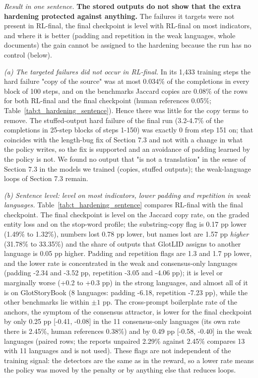 \emph{Result in one sentence.} \textbf{The stored outputs do not show that the extra hardening protected against anything.} The failures it targets were not present in RL-final, the final checkpoint is level with RL-final on most indicators, and where it is better (padding and repetition in the weak languages, whole documents) the gain cannot be assigned to the hardening because the run has no control (below).

\emph{(a) The targeted failures did not occur in RL-final.} In its 1,433 training steps the hard failure "copy of the source" was at most 0.034\% of the completions in every block of 100 steps, and on the benchmarks Jaccard copies are 0.08\% of the rows for both RL-final and the final checkpoint (human references 0.05\%; Table~\ref{tab:t_hardening_sentence}). Hence there was little for the copy terms to remove. The stuffed-output hard failure of the final run (3.2-4.7\% of the completions in 25-step blocks of steps 1-150) was exactly 0 from step 151 on; that coincides with the length-bug fix of Section 7.3 and not with a change in what the policy writes, so the fix is supported and an avoidance of padding learned by the policy is not. We found no output that "is not a translation" in the sense of Section 7.3 in the models we trained (copies, stuffed outputs); the weak-language loops of Section 7.3 remain.

\emph{(b) Sentence level: level on most indicators, lower padding and repetition in weak languages.} Table~\ref{tab:t_hardening_sentence} compares RL-final with the final checkpoint. The final checkpoint is level on the Jaccard copy rate, on the graded entity loss and on the stop-word profile; the substring-copy flag is 0.17 pp lower (1.49\% to 1.32\%), numbers lost 0.78 pp lower, but names lost are 1.57 pp \emph{higher} (31.78\% to 33.35\%) and the share of outputs that GlotLID assigns to another language is 0.05 pp higher. Padding and repetition flags are 1.3 and 1.7 pp lower, and the lower rate is concentrated in the weak and consensus-only languages (padding -2.34 and -3.52 pp, repetition -3.05 and -4.06 pp); it is level or marginally worse (+0.2 to +0.3 pp) in the strong languages, and almost all of it is on GlotStoryBook (8 languages: padding -6.18, repetition -7.23 pp), while the other benchmarks lie within \(\pm 1\) pp. The cross-prompt boilerplate rate of the anchors, the symptom of the consensus attractor, is lower for the final checkpoint by only 0.25 pp {[}-0.41, -0.08{]} in the 11 consensus-only languages (its own rate there is 2.45\%, human references 0.38\%) and by 0.49 pp {[}-0.58, -0.40{]} in the weak languages (paired rows; the report\textquotesingle s unpaired 2.29\% against 2.45\% compares 13 with 11 languages and is not used). These flags are not independent of the training signal: the detectors are the same as in the reward, so a lower rate means the policy was moved by the penalty or by anything else that reduces loops.

